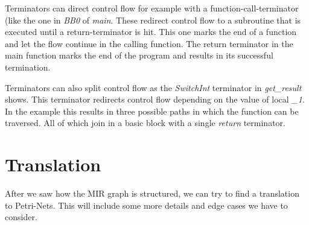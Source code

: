 Terminators can direct control flow for example with a function-call-terminator (like the one in \textit{BB0} of \textit{main}.
These redirect control flow to a subroutine that is executed until a return-terminator is hit.
This one marks the end of a function and let the flow continue in the calling function.
The return terminator in the main function marks the end of the program and results in its successful termination.

Terminators can also split control flow as the \textit{SwitchInt} terminator in \textit{get\_result} shows.
This terminator redirects control flow depending on the value of local \textit{\_1}.
In the example this results in three possible paths in which the function can be traversed.
All of which join in a basic block with a single \textit{return} terminator.

\section{Translation}
\label{app_trans}
After we saw how the MIR graph is structured, we can try to find a translation to Petri-Nets. This will include some more details and edge cases we have to consider.

